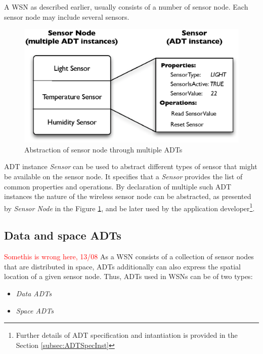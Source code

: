 A WSN as described earlier, usually consists of a number of sensor node. Each
sensor node may include several sensors.

\begin{figure}
\centering
\includegraphics[scale=0.71]{img/ADTsMultipleInstances.eps}
\caption[Abstraction of sensor node through multiple ADTs]{Abstraction of sensor node through multiple ADTs}
\label{Fig:MultipleADTs}
\end{figure} 
  
ADT instance \emph{Sensor} can be used to abstract different types of sensor
that might be available on the sensor node. It specifies that a \emph{Sensor}
provides the list of common properties and operations. 
By declaration of multiple such ADT instances the nature of the
wireless sensor node can be abstracted, as presented by \emph{Sensor Node} in
the Figure \ref{Fig:MultipleADTs}, and be later used by the application
developer\footnote{Further details of ADT specification and
intantiation is provided in the Section \ref{subsec:ADTSpecInst}}.

\subsection{Data and space ADTs} \label{subsubsec:DataAndSpaceADTs}

\textcolor{red}{Somethis is wrong here, 13/08}
As a WSN consists of a collection of sensor nodes that are distributed in space,
ADTs additionally can also express the spatial location of a given sensor node.
Thus, ADTs used in WSNs can be of two types:

\begin{itemize}
  \item \emph{Data ADTs}
  \item \emph{Space ADTs} 
\end{itemize}

